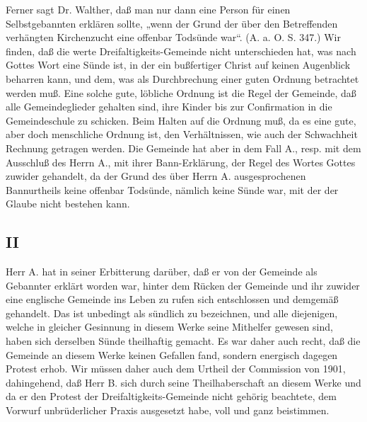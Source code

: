 Ferner sagt Dr. Walther, daß man nur dann eine Person für einen Selbstgebannten erklären sollte, „wenn der Grund der über den Betreffenden verhängten Kirchenzucht eine offenbar Todsünde war“. (A. a. O. S. 347.) Wir finden, daß die werte Dreifaltigkeits-Gemeinde nicht unterschieden hat, was nach Gottes Wort eine Sünde ist, in der ein bußfertiger Christ auf keinen Augenblick beharren kann, und dem, was als Durchbrechung einer guten Ordnung betrachtet werden muß. Eine solche gute, löbliche Ordnung ist die Regel der Gemeinde, daß alle Gemeindeglieder gehalten sind, ihre Kinder bis zur Confirmation in die Gemeindeschule zu schicken. Beim Halten auf die Ordnung muß, da es eine gute, aber doch menschliche Ordnung ist, den Verhältnissen, wie auch der Schwachheit Rechnung getragen werden. Die Gemeinde hat aber in dem Fall A., resp. mit dem Ausschluß des Herrn A., mit ihrer Bann-Erklärung, der Regel des Wortes Gottes zuwider gehandelt, da der Grund des über Herrn A. ausgesprochenen Bannurtheils keine offenbar Todsünde, nämlich keine Sünde war, mit der der Glaube nicht bestehen kann.

\subsection{II}

Herr A. hat in seiner Erbitterung darüber, daß er von der Gemeinde als Gebannter erklärt worden war, hinter dem Rücken der Gemeinde und ihr zuwider eine englische Gemeinde ins Leben zu rufen sich entschlossen und demgemäß gehandelt. Das ist unbedingt als sündlich zu bezeichnen, und alle diejenigen, welche in gleicher Gesinnung in diesem Werke seine Mithelfer gewesen sind, haben sich derselben Sünde theilhaftig gemacht. Es war daher auch recht, daß die Gemeinde an diesem Werke keinen Gefallen fand, sondern energisch dagegen Protest erhob. Wir müssen daher auch dem Urtheil der Commission von 1901, dahingehend, daß Herr B. sich durch seine Theilhaberschaft an diesem Werke und da er den Protest der Dreifaltigkeits-Gemeinde nicht gehörig beachtete, dem Vorwurf unbrüderlicher Praxis ausgesetzt habe, voll und ganz beistimmen.

